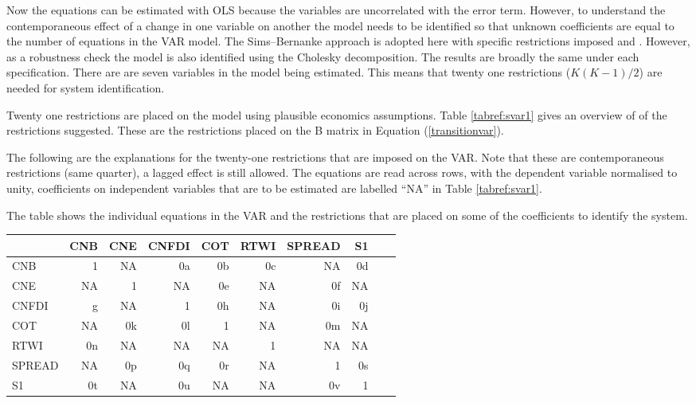 \documentclass[jrfm,article,accept,moreauthors,pdftex]{Definitions/mdpi}
\begin{document}
Now the equations can be estimated with OLS because the variables are uncorrelated with the error term.  However, to understand the contemporaneous effect of a change in one variable on another the model needs to be identified so that unknown coefficients are equal to the number of equations in the VAR model. The Sims--Bernanke approach is adopted here with specific restrictions imposed \citep{Sims1986} and \citep{Bernanke1986}.  However, as a robustness check the model is also identified using the Cholesky decomposition. The results are broadly the same under each specification.  There are are seven variables in the model being estimated. This means that  twenty one restrictions ($K(K-1)/2$) are needed for system identification.    

Twenty one restrictions are placed on the model using plausible economics assumptions. Table \ref{tabref:svar1} gives an overview of of the restrictions suggested. These are the restrictions placed on the B matrix in Equation (\ref{transitionvar}).  

The following are the explanations for the twenty-one restrictions that are imposed on the VAR.  Note that these are contemporaneous restrictions (same quarter), a lagged effect is still allowed.  The equations are read across rows, with the dependent variable normalised to unity, coefficients on independent variables that are to be estimated are labelled ``NA'' in Table \ref{tabref:svar1}.     

\begin{specialtable}[H]
\caption{The table shows the individual equations in the VAR and the restrictions that are placed on some of the coefficients to identify the system. }
\label{tabref:svar1}
\setlength{\tabcolsep}{3.13mm}
{\small\begin{tabular}{p{3cm} rrrrrrrrr}	
  \toprule
 &  \textbf{CNB} & \textbf{CNE} & \textbf{CNFDI} & \textbf{COT} & \textbf{RTWI} & \textbf{SPREAD} & \textbf{S1} \\ 
  \midrule
  CNB & 1 & NA & 0\footnotesize{a} & 0\footnotesize{b} & 0\footnotesize{c} & NA & 0\footnotesize{d}\\ 
  CNE & NA & 1 & NA & 0\footnotesize{e} & NA & 0\footnotesize{f} & NA\\ 
  CNFDI & \footnotesize{g} & NA & 1 & 0\footnotesize{h} & NA & 0\footnotesize{i} & 0\footnotesize{j}\\ 
  COT & NA & 0\footnotesize{k} & 0\footnotesize{l} & 1 & NA & 0\footnotesize{m} & NA \\ 
   RTWI & 0n & NA & NA & NA & 1 & NA & NA\\ 
  SPREAD & NA & 0\footnotesize{p} & 0\footnotesize{q} & 0\footnotesize{r} & NA & 1 & 0\footnotesize{s}\\ 
  S1 & 0\footnotesize{t} & NA & 0\footnotesize{u} & NA & NA & 0\footnotesize{v} & 1 \\\bottomrule
  
\end{tabular}}

\end{specialtable}
\end{document}
